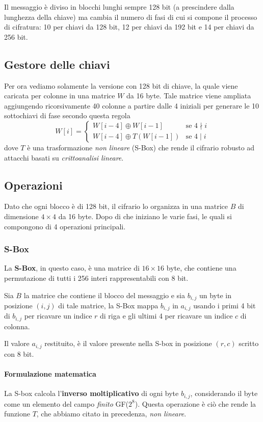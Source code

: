 Il messaggio \`e diviso in blocchi lunghi sempre 128 bit (a prescindere dalla lunghezza della chiave) ma cambia il
numero di fasi di cui si compone il processo di cifratura: 10 per chiavi da 128 bit, 12 per chiavi da 192 bit e 14
per chiavi da 256 bit.

\subsection{Gestore delle chiavi}
Per ora vediamo solamente la versione con 128 bit di chiave, la quale viene caricata per colonne in una matrice $W$ da
16 byte. Tale matrice viene ampliata aggiungendo ricorsivamente 40 colonne a partire dalle 4 iniziali per generare le
10 sottochiavi di fase secondo questa regola
\[
	W[i] = \begin{cases}
		W[i - 4] \oplus W[i - 1]    & \text{se } 4 \nmid i \\
		W[i - 4] \oplus T(W[i - 1]) & \text{se } 4 \mid i
	\end{cases}
\]
dove $T$ \`e una trasformazione \emph{non lineare} (S-Box) che rende il cifrario robusto ad attacchi basati su
\emph{crittoanalisi lineare}.

\subsection{Operazioni}
Dato che ogni blocco \`e di 128 bit, il cifrario lo organizza in una matrice $B$ di dimensione $4 \times 4$ da 16 byte.
Dopo di che iniziano le varie fasi, le quali si compongono di 4 operazioni principali.

\subsubsection{S-Box}
La \textbf{S-Box}, in questo caso, \`e una matrice di $16 \times 16$ byte, che contiene una permutazione di tutti i 256
interi rappresentabili con 8 bit.

Sia $B$ la matrice che contiene il blocco del messaggio e sia $b_{i, j}$ un byte in posizione $(i, j)$ di tale matrice,
la S-Box mappa $b_{i, j}$ in $a_{i, j}$ usando i primi 4 bit di $b_{i, j}$ per ricavare un indice $r$ di riga e gli
ultimi 4 per ricavare un indice $c$ di colonna.

Il valore $a_{i, j}$ restituito, \`e il valore presente nella S-box in posizione $(r, c)$ scritto con 8 bit.

\paragraph{Formulazione matematica}
La S-box calcola l'\textbf{inverso moltiplicativo} di ogni byte $b_{i, j}$, considerando il byte come un elemento del
campo \emph{finito} GF($2^8$). Questa operazione \`e ci\`o che rende la funzione $T$, che abbiamo citato in precedenza,
\emph{non lineare}.

